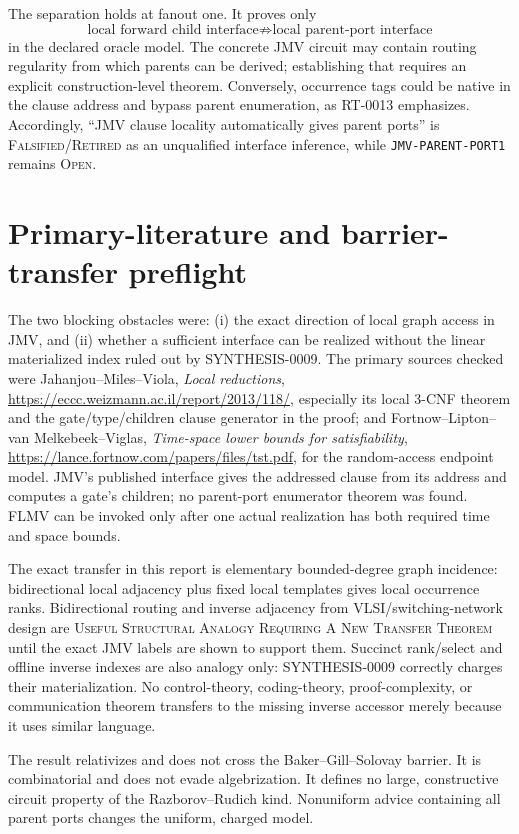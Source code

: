 \documentclass[11pt]{article}
\newcommand{\status}[1]{\textsc{#1}}
\begin{document}
The separation holds at fanout one.  It proves only
\[
  \text{local forward child interface}\not\Rightarrow
  \text{local parent-port interface}
\]
in the declared oracle model.  The concrete JMV circuit may contain routing
regularity from which parents can be derived; establishing that requires an
explicit construction-level theorem.  Conversely, occurrence tags could be
native in the clause address and bypass parent enumeration, as RT-0013
emphasizes.  Accordingly, ``JMV clause locality automatically gives parent
ports'' is \status{Falsified/Retired} as an unqualified interface inference,
while \texttt{JMV-PARENT-PORT1} remains \status{Open}.

\section{Primary-literature and barrier-transfer preflight}

The two blocking obstacles were: (i) the exact direction of local graph
access in JMV, and (ii) whether a sufficient interface can be realized
without the linear materialized index ruled out by SYNTHESIS-0009.  The
primary sources checked were Jahanjou--Miles--Viola, \emph{Local reductions},
\url{https://eccc.weizmann.ac.il/report/2013/118/}, especially its local
3-CNF theorem and the gate/type/children clause generator in the proof; and
Fortnow--Lipton--van Melkebeek--Viglas, \emph{Time-space lower bounds for
satisfiability}, \url{https://lance.fortnow.com/papers/files/tst.pdf}, for the
random-access endpoint model.  JMV's published interface gives the addressed
clause from its address and computes a gate's children; no parent-port
enumerator theorem was found.  FLMV can be invoked only after one actual
realization has both required time and space bounds.

The exact transfer in this report is elementary bounded-degree graph
incidence: bidirectional local adjacency plus fixed local templates gives
local occurrence ranks.  Bidirectional routing and inverse adjacency from
VLSI/switching-network design are \status{Useful Structural Analogy Requiring
A New Transfer Theorem} until the exact JMV labels are shown to support
them.  Succinct rank/select and offline inverse indexes are also analogy only:
SYNTHESIS-0009 correctly charges their materialization.  No control-theory,
coding-theory, proof-complexity, or communication theorem transfers to the
missing inverse accessor merely because it uses similar language.

The result relativizes and does not cross the Baker--Gill--Solovay barrier.
It is combinatorial and does not evade algebrization.  It defines no large,
constructive circuit property of the Razborov--Rudich kind.  Nonuniform
advice containing all parent ports changes the uniform, charged model.
\end{document}
